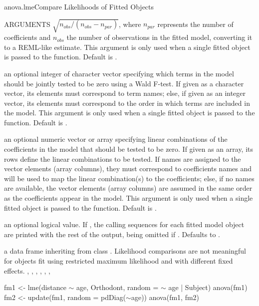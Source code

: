 \documentclass[pdftex]{article} \usepackage{url,graphicx}
\renewcommand{\Twiddle}{\mbox{\(\sim\)}}
\begin{document}
\begin{Helpfile}{anova.lme}{Compare Likelihoods of Fitted Objects}
\begin{Argument}{ARGUMENTS}
  $\sqrt{n_{obs}/(n_{obs} - n_{par})}$, where $n_{par}$ represents the
  number of coefficients and $n_{obs}$ the number of observations in
  the fitted model, converting it to a REML-like estimate. This
  argument is only used when a single fitted object is passed to the
  function. Default is .
\item[\Co{terms:}]
an optional integer of character vector specifying which
terms in the model should be jointly tested to be zero using a Wald
F-test. If given as a character vector, its elements must correspond
to term names; else, if given as an integer vector, its elements must
correspond to the order in which terms are included in the
model. This argument is only used when a single fitted object is
passed to the function. Default is .
\item[\Co{L:}]
an optional numeric vector or array specifying linear
combinations of the coefficients in the model that should be tested
to be zero. If given as an array, its rows define the linear
combinations to be tested. If names are assigned to the vector
elements (array columns), they must correspond to coefficients
names and will be used to map the linear combination(s) to the
coefficients; else, if no names are available, the vector elements
(array columns) are assumed in the same order as the coefficients
appear in the model. This argument is only used when a single fitted
object is passed to the function. Default is .
\item[\Co{verbose:}]
an optional logical value. If , the calling
sequences for each fitted model object are printed with the rest of
the output, being omitted if . Defaults to
.
\end{Argument}
a data frame inheriting from class .
 Likelihood comparisons are not meaningful for objects fit using
restricted maximum likelihood and with different fixed effects.
, , ,
, , ,
\need 15pt
\vspace{-16pt}
\begin{Example}
fm1 <- lme(distance {\Twiddle} age, Orthodont, random = {\Twiddle} age | Subject)
anova(fm1)
fm2 <- update(fm1, random = pdDiag({\Twiddle}age))
anova(fm1, fm2)
\end{Example}
\end{Helpfile}
\end{document}
